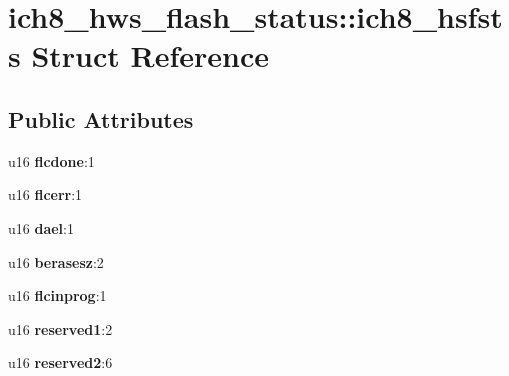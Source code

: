 \hypertarget{structich8__hws__flash__status_1_1ich8__hsfsts}{
\section{ich8\_\-hws\_\-flash\_\-status::ich8\_\-hsfsts Struct Reference}
\label{structich8__hws__flash__status_1_1ich8__hsfsts}
}
\subsection*{Public Attributes}
\begin{DoxyCompactItemize}
\item 
\hypertarget{structich8__hws__flash__status_1_1ich8__hsfsts_a64b1609d559974a1d270d861173a89f2}{
u16 {\bfseries flcdone}:1}
\label{structich8__hws__flash__status_1_1ich8__hsfsts_a64b1609d559974a1d270d861173a89f2}

\item 
\hypertarget{structich8__hws__flash__status_1_1ich8__hsfsts_a600526ded89aede1e4dff296c981ee2f}{
u16 {\bfseries flcerr}:1}
\label{structich8__hws__flash__status_1_1ich8__hsfsts_a600526ded89aede1e4dff296c981ee2f}

\item 
\hypertarget{structich8__hws__flash__status_1_1ich8__hsfsts_aa62f5adcedf41f8dfc579183f16d4487}{
u16 {\bfseries dael}:1}
\label{structich8__hws__flash__status_1_1ich8__hsfsts_aa62f5adcedf41f8dfc579183f16d4487}

\item 
\hypertarget{structich8__hws__flash__status_1_1ich8__hsfsts_a80b661e46fe94a34177fb669122dd4d0}{
u16 {\bfseries berasesz}:2}
\label{structich8__hws__flash__status_1_1ich8__hsfsts_a80b661e46fe94a34177fb669122dd4d0}

\item 
\hypertarget{structich8__hws__flash__status_1_1ich8__hsfsts_a24cf1905b97f7952cf9e0db124a3bc41}{
u16 {\bfseries flcinprog}:1}
\label{structich8__hws__flash__status_1_1ich8__hsfsts_a24cf1905b97f7952cf9e0db124a3bc41}

\item 
\hypertarget{structich8__hws__flash__status_1_1ich8__hsfsts_abaa5369626bd45adb42d243dc7fb15e3}{
u16 {\bfseries reserved1}:2}
\label{structich8__hws__flash__status_1_1ich8__hsfsts_abaa5369626bd45adb42d243dc7fb15e3}

\item 
\hypertarget{structich8__hws__flash__status_1_1ich8__hsfsts_a7af2e8715b6ac8703fb30250988038b8}{
u16 {\bfseries reserved2}:6}
\label{structich8__hws__flash__status_1_1ich8__hsfsts_a7af2e8715b6ac8703fb30250988038b8}


\end{DoxyCompactItemize}
